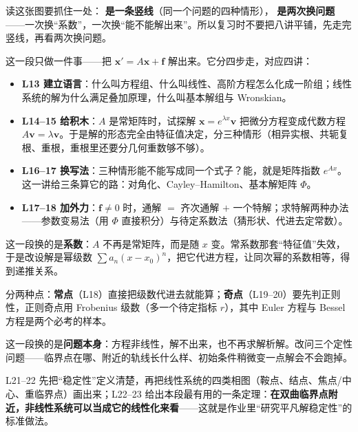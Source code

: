 \documentclass[11pt]{ctexart}
\begin{document}
读这张图要抓住一处：\textbf{ 是一条竖线}（同一个问题的四种情形），\textbf{ 是两次换问题}——一次换“系数”，一次换“能不能解出来”。所以复习时不要把八讲平铺，先走完竖线，再看两次换问题。



这一段只做一件事——把 $\mathbf{x}'=A\mathbf{x}+\mathbf{f}$ 解出来。它分四步走，对应四讲：

\begin{itemize}
  \item \textbf{L13 建立语言}：什么叫方程组、什么叫线性、高阶方程怎么化成一阶组；线性系统的解为什么满足叠加原理，什么叫基本解组与 Wronskian。
  \item \textbf{L14--15 给积木}：$A$ 是常矩阵时，试探解 $\mathbf{x}=e^{\lambda x}\mathbf{v}$ 把微分方程变成代数方程 $A\mathbf{v}=\lambda\mathbf{v}$。于是解的形态完全由特征值决定，分三种情形（相异实根、共轭复根、重根，重根里还要分几何重数够不够）。
  \item \textbf{L16--17 换写法}：三种情形能不能写成同一个式子？能，就是矩阵指数 $e^{Ax}$。这一讲给三条算它的路：对角化、Cayley--Hamilton、基本解矩阵 $\Phi$。
  \item \textbf{L17--18 加外力}：$\mathbf{f}\neq0$ 时，通解 $=$ 齐次通解 $+$ 一个特解；求特解两种办法——参数变易法（用 $\Phi$ 直接积分）与待定系数法（猜形状、代进去定常数）。
\end{itemize}


这一段换的是\textbf{系数}：$A$ 不再是常矩阵，而是随 $x$ 变。常系数那套“特征值”失效，于是改设解是幂级数 $\sum a_n(x-x_0)^n$，把它代进方程，让同次幂的系数相等，得到递推关系。

分两种点：\textbf{常点}（L18）直接把级数代进去就能算；\textbf{奇点}（L19--20）要先判正则性，正则奇点用 Frobenius 级数（多一个待定指标 $r$），其中 Euler 方程与 Bessel 方程是两个必考的样本。


这一段换的是\textbf{问题本身}：方程非线性，解不出来，也不再求解析解。改问三个定性问题——临界点在哪、附近的轨线长什么样、初始条件稍微变一点解会不会跑掉。

L21--22 先把“稳定性”定义清楚，再把线性系统的四类相图（鞍点、结点、焦点/中心、重临界点）画出来；L22--23 给出本段最有用的一条定理：\textbf{在双曲临界点附近，非线性系统可以当成它的线性化来看}——这就是作业里“研究平凡解稳定性”的标准做法。
\end{document}
